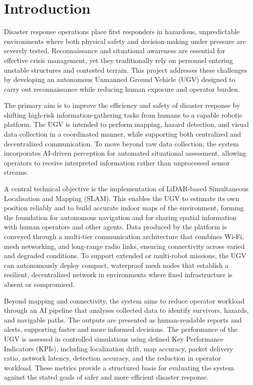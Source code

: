 
\chapter{Introduction}
\label{ch:intro}

Disaster response operations place first responders in hazardous, unpredictable environments where both physical safety and decision-making under pressure are severely tested. Reconnaissance and situational awareness are essential for effective crisis management, yet they traditionally rely on personnel entering unstable structures and contested terrain. This project addresses these challenges by developing an autonomous Unmanned Ground Vehicle (UGV) designed to carry out reconnaissance while reducing human exposure and operator burden.

The primary aim is to improve the efficiency and safety of disaster response by shifting high-risk information-gathering tasks from humans to a capable robotic platform. The UGV is intended to perform mapping, hazard detection, and visual data collection in a coordinated manner, while supporting both centralized and decentralized communication. To move beyond raw data collection, the system incorporates AI-driven perception for automated situational assessment, allowing operators to receive interpreted information rather than unprocessed sensor streams.

A central technical objective is the implementation of LiDAR-based Simultaneous Localisation and Mapping (SLAM). This enables the UGV to estimate its own position reliably and to build accurate indoor maps of the environment, forming the foundation for autonomous navigation and for sharing spatial information with human operators and other agents. Data produced by the platform is conveyed through a multi-tier communication architecture that combines Wi-Fi, mesh networking, and long-range radio links, ensuring connectivity across varied and degraded conditions. To support extended or multi-robot missions, the UGV can autonomously deploy compact, waterproof mesh nodes that establish a resilient, decentralized network in environments where fixed infrastructure is absent or compromised.

Beyond mapping and connectivity, the system aims to reduce operator workload through an AI pipeline that analyses collected data to identify survivors, hazards, and navigable paths. The outputs are presented as human-readable reports and alerts, supporting faster and more informed decisions. The performance of the UGV is assessed in controlled simulations using defined Key Performance Indicators (KPIs), including localization drift, map accuracy, packet delivery ratio, network latency, detection accuracy, and the reduction in operator workload. These metrics provide a structured basis for evaluating the system against the stated goals of safer and more efficient disaster response.


